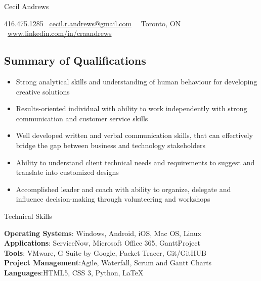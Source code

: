 \documentclass{article}
\begin{document}
\begin{center}
   
 \Huge\textcolor{ablue}{Cecil Andrews}

\end{center}

\begin{center}
416.475.1285 \vert  \ \href{mailto:cecil.r.andrews@gmail.com}{cecil.r.andrews@gmail.com}  \ \vert  \ Toronto, ON \vert  \ \href{http://www.linkedin.com/in/craandrews}{www.linkedin.com/in/craandrews}
\end{center}

\begin{center}
\section*{Summary of Qualifications}
\end{center}


\begin{flushleft}
\begin{itemize}
\item Strong analytical skills and understanding of human behaviour for developing creative solutions\\
\item Results-oriented individual with ability to work independently with strong communication and customer service skills \\
\item Well developed written and verbal communication skills, that can effectively bridge the gap between business and technology stakeholders \\
\item Ability to understand client technical needs and requirements to suggest and translate into customized designs\\
\item Accomplished leader and  coach with ability to organize, delegate and influence decision-making through volunteering and workshops
\end{itemize}
\end{flushleft}

\begin{center}
\large{Technical Skills}
\end{center}

\begin{flushleft}
\begin{itemize}

\textbf{Operating Systems}: Windows, Android, iOS, Mac OS, Linux\\
\textbf{Applications}: ServiceNow, Microsoft Office 365, GanttProject\\
\textbf{Tools}: VMware, G Suite by Google, Packet Tracer, Git/GitHUB\\
\textbf{Project Management}:Agile, Waterfall, Scrum and Gantt Charts\\
\textbf{Languages}:HTML5, CSS 3, Python, LaTeX \\
\end{itemize}
\end{flushleft}
\end{document}
